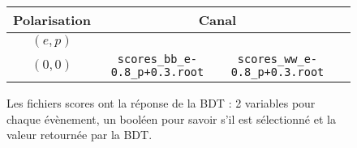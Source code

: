 

\begin{figure}[h!]
	\centering
	\begin{tabular}{ | c | c | c | c | }
		\hline
		Polarisation & \multicolumn{2}{c|}{Canal} \\
		\hline
		$(e,p)$ & \bb &  \WW \\
		\hline \cline{2-3}
		$(0,0)$ & \verb|scores_bb_e-0.8_p+0.3.root| & \verb|scores_ww_e-0.8_p+0.3.root| \\
		\hline
	\end{tabular}
	\label{files:scores}
	\caption{Les fichiers scores ont la réponse de la BDT : 2 variables pour chaque évènement, un booléen pour savoir s'il est sélectionné et la valeur retournée par la BDT.}
\end{figure}